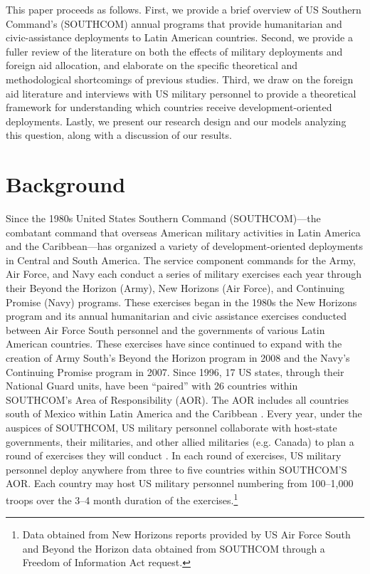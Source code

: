 \documentclass[12pt]{article}
\begin{document}
\begin{doublespace}
This paper proceeds as follows. First, we provide a brief overview of US Southern Command's (SOUTHCOM) annual programs that provide humanitarian and civic-assistance deployments to Latin American countries. Second, we provide a fuller review of the literature on both the effects of military deployments and foreign aid allocation, and elaborate on the specific theoretical and methodological shortcomings of previous studies. Third, we draw on the foreign aid literature and interviews with US military personnel to provide a theoretical framework for understanding which countries receive development-oriented deployments. Lastly, we present our research design and our models analyzing this question, along with a discussion of our results.


\section{Background}

Since the 1980s United States Southern Command (SOUTHCOM)---the combatant command that overseas American military activities in Latin America and the Caribbean---has organized a variety of development-oriented deployments in Central and South America. The service component commands for the Army, Air Force, and Navy each conduct a series of military exercises each year through their Beyond the Horizon (Army), New Horizons (Air Force), and Continuing Promise (Navy) programs. These exercises began in the 1980s the New Horizons program and its annual humanitarian and civic assistance exercises conducted between Air Force South personnel and the governments of various Latin American countries. These exercises have since continued to expand with the creation of Army South's Beyond the Horizon program in 2008 and the Navy's Continuing Promise program in 2007. Since 1996, 17 US states, through their National Guard units, have been ``paired'' with 26 countries within SOUTHCOM's Area of Responsibility (AOR). The AOR includes all countries south of Mexico within Latin America and the Caribbean \cite{southcom2015}. Every year, under the auspices of SOUTHCOM, US military personnel collaborate with host-state governments, their militaries, and other allied militaries (e.g. Canada) to plan a round of exercises they will conduct \cite{SouthcomStatePartner}. In each round of exercises, US military personnel deploy anywhere from three to five countries within SOUTHCOM'S AOR. Each country may host US military personnel numbering from 100--1,000 troops over the 3--4 month duration of the exercises.\footnote{Data obtained from New Horizons reports provided by US Air Force South and Beyond the Horizon data obtained from SOUTHCOM through a Freedom of Information Act request.}


\end{doublespace}
\end{document}
